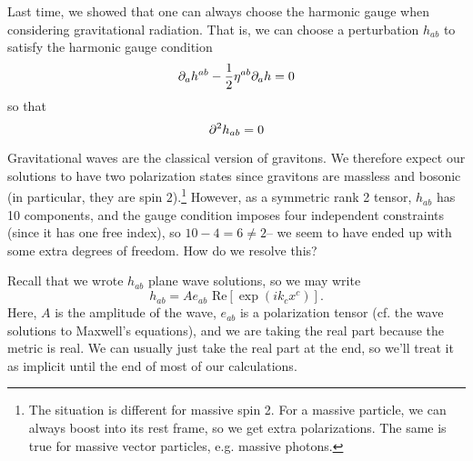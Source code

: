 Last time, we showed that one can always choose the harmonic gauge when considering gravitational radiation. That is, we can choose a perturbation $h_{ab}$ to satisfy the harmonic gauge condition
$$\partial_a h^{ab}-\frac{1}{2} \eta^{ab} \partial_a h=0$$
so that
\begin{equation*}
    \partial^2 h_{ab}=0
\end{equation*}

Gravitational waves are the classical version of gravitons. We therefore expect our solutions to have two polarization states since gravitons are massless and bosonic (in particular, they are spin $2$).\footnote{The situation is different for massive spin 2. For a massive particle, we can always boost into its rest frame, so we get extra polarizations. The same is true for massive vector particles, e.g. massive photons.} However, as a symmetric rank 2 tensor, $h_{ab}$ has 10 components, and the gauge condition imposes four independent constraints (since it has one free index), so $10-4=6\neq 2$-- we seem to have ended up with some extra degrees of freedom. How do we resolve this?

Recall that we wrote $h_{ab}$ plane wave solutions, so we may write
$$h_{ab}=A e_{ab} \text{ Re}\left[\exp(ik_c x^c)\right].$$
Here, $A$ is the amplitude of the wave, $e_{ab}$ is a polarization tensor (cf. the wave solutions to Maxwell's equations), and we are taking the real part because the metric is real. We can usually just take the real part at the end, so we'll treat it as implicit until the end of most of our calculations.

